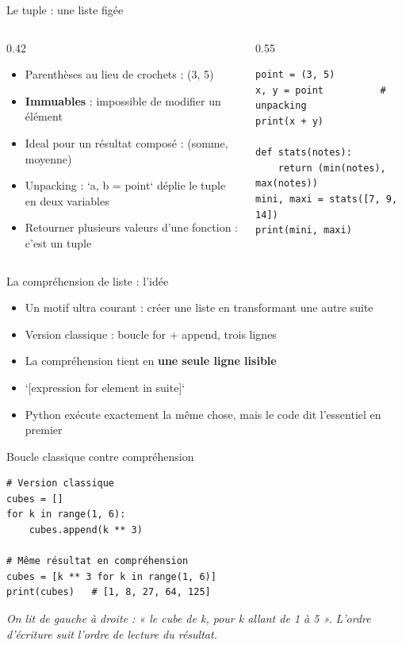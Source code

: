 \documentclass[aspectratio=169,11pt]{beamer}
\begin{document}
\begin{frame}[fragile]{Le tuple : une liste figée}
\begin{columns}[t]
\begin{column}{0.42\textwidth}
\begin{itemize}
  \setlength{\itemsep}{1.5pt}\setlength{\parskip}{0pt}
  \item Parenthèses au lieu de crochets : (3, 5)
  \item \textbf{Immuables} : impossible de modifier un élément
  \item Ideal pour un résultat composé : (somme, moyenne)
  \item Unpacking : `a, b = point` déplie le tuple en deux variables
  \item Retourner plusieurs valeurs d'une fonction : c'est un tuple
\end{itemize}
\end{column}
\hspace{0.02\textwidth}
\begin{column}{0.55\textwidth}
\begin{lstlisting}[style=pysmall]
point = (3, 5)
x, y = point          # unpacking
print(x + y)

def stats(notes):
    return (min(notes), max(notes))
mini, maxi = stats([7, 9, 14])
print(mini, maxi)
\end{lstlisting}
\end{column}
\end{columns}
\end{frame}

\begin{frame}{La compréhension de liste : l'idée}
\begin{itemize}
  \item Un motif ultra courant : créer une liste en transformant une autre suite
  \item Version classique : boucle for + append, trois lignes
  \item La compréhension tient en \textbf{une seule ligne lisible}
  \item `[expression for element in suite]`
  \item Python exécute exactement la même chose, mais le code dit l'essentiel en premier
\end{itemize}
\end{frame}

\begin{frame}[fragile]{Boucle classique contre compréhension}

\begin{lstlisting}[style=py]
# Version classique
cubes = []
for k in range(1, 6):
    cubes.append(k ** 3)

# Même résultat en compréhension
cubes = [k ** 3 for k in range(1, 6)]
print(cubes)   # [1, 8, 27, 64, 125]
\end{lstlisting}
\vspace{0.5pt}

{\small\color{PyGris}\itshape On lit de gauche à droite : « le cube de k, pour k allant de 1 à 5 ». L'ordre d'écriture suit l'ordre de lecture du résultat.}

\end{frame}
\end{document}
